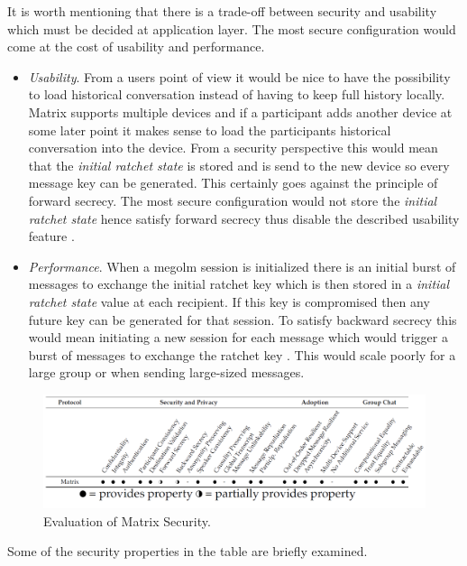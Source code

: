 It is worth mentioning that there is a trade-off between security and usability which must be decided at application layer. The most secure configuration would come at the cost of usability and performance.    
\begin{itemize}
	\item \emph{Usability}. From a users point of view it would be nice to have the possibility to load historical conversation instead of having to keep full history locally. Matrix supports multiple devices and if a participant adds another device at some later point it makes sense to load the participants historical conversation into the device. From a security perspective this would mean that the \emph{initial ratchet state} is stored and is send to the new device so every message key can be generated. This certainly goes against the principle of forward secrecy. The most secure configuration would not store the \emph{initial ratchet state} hence satisfy forward secrecy thus disable the described usability feature \cite{ncc} \cite{megolm}.
	\item \emph{Performance}. When a megolm session is initialized there is an initial burst of messages to exchange the initial ratchet key which is then stored in a \emph{initial ratchet state} value at each recipient. If this key is compromised then any future key can be generated for that session. To satisfy backward secrecy this would mean initiating a new session for each message which would trigger a burst of messages to exchange the ratchet key \cite{ncc} \cite{megolm}. This would scale poorly for a large group or when sending large-sized messages. 
\end{itemize} 


\begin{figure}[H]
	\hspace*{-1.7cm} 
	\centering
	\includegraphics[width=16cm]{figures/framework.png}
	\caption{Evaluation of Matrix Security.}
	\label{fig:framework}
\end{figure}

Some of the security properties in the table are briefly examined.

